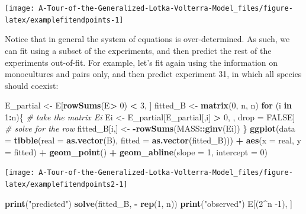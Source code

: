 \documentclass[]{book}
\newenvironment{Shaded}{\begin{snugshade}}{\end{snugshade}}
\newcommand{\CommentTok}[1]{\textcolor[rgb]{0.56,0.35,0.01}{\textit{#1}}}
\newcommand{\ControlFlowTok}[1]{\textcolor[rgb]{0.13,0.29,0.53}{\textbf{#1}}}
\newcommand{\DataTypeTok}[1]{\textcolor[rgb]{0.13,0.29,0.53}{#1}}
\newcommand{\DecValTok}[1]{\textcolor[rgb]{0.00,0.00,0.81}{#1}}
\newcommand{\KeywordTok}[1]{\textcolor[rgb]{0.13,0.29,0.53}{\textbf{#1}}}
\newcommand{\NormalTok}[1]{#1}
\newcommand{\OperatorTok}[1]{\textcolor[rgb]{0.81,0.36,0.00}{\textbf{#1}}}
\newcommand{\OtherTok}[1]{\textcolor[rgb]{0.56,0.35,0.01}{#1}}
\newcommand{\StringTok}[1]{\textcolor[rgb]{0.31,0.60,0.02}{#1}}
\begin{document}
\begin{center}\texttt{[image: A-Tour-of-the-Generalized-Lotka-Volterra-Model\_files/figure-latex/examplefitendpoints-1]} \end{center}

Notice that in general the system of equations is over-determined. As such, we can fit using a subset of the experiments, and then predict the rest of the experiments out-of-fit. For example, let's fit again using the information on monocultures and pairs only, and then predict experiment 31, in which all species should coexist:

\begin{Shaded}
\begin{Highlighting}[]
\NormalTok{E_partial <-}\StringTok{ }\NormalTok{E[}\KeywordTok{rowSums}\NormalTok{(E}\OperatorTok{>}\StringTok{ }\DecValTok{0}\NormalTok{) }\OperatorTok{<}\StringTok{ }\DecValTok{3}\NormalTok{, ]}
\NormalTok{fitted_B <-}\StringTok{ }\KeywordTok{matrix}\NormalTok{(}\DecValTok{0}\NormalTok{, n, n)}
\ControlFlowTok{for}\NormalTok{ (i }\ControlFlowTok{in} \DecValTok{1}\OperatorTok{:}\NormalTok{n)\{}
  \CommentTok{# take the matrix Ei}
\NormalTok{  Ei <-}\StringTok{ }\NormalTok{E_partial[E_partial[,i] }\OperatorTok{>}\StringTok{ }\DecValTok{0}\NormalTok{, , drop =}\StringTok{ }\OtherTok{FALSE}\NormalTok{]}
  \CommentTok{# solve for the row}
\NormalTok{  fitted_B[i,] <-}\StringTok{ }\OperatorTok{-}\KeywordTok{rowSums}\NormalTok{(MASS}\OperatorTok{::}\KeywordTok{ginv}\NormalTok{(Ei))}
\NormalTok{\}}
\KeywordTok{ggplot}\NormalTok{(}\DataTypeTok{data =} \KeywordTok{tibble}\NormalTok{(}\DataTypeTok{real =} \KeywordTok{as.vector}\NormalTok{(B),}
                     \DataTypeTok{fitted =} \KeywordTok{as.vector}\NormalTok{(fitted_B))) }\OperatorTok{+}\StringTok{ }
\StringTok{  }\KeywordTok{aes}\NormalTok{(}\DataTypeTok{x =}\NormalTok{ real, }\DataTypeTok{y =}\NormalTok{ fitted) }\OperatorTok{+}\StringTok{ }\KeywordTok{geom_point}\NormalTok{() }\OperatorTok{+}\StringTok{ }
\StringTok{  }\KeywordTok{geom_abline}\NormalTok{(}\DataTypeTok{slope =} \DecValTok{1}\NormalTok{, }\DataTypeTok{intercept =} \DecValTok{0}\NormalTok{)}
\end{Highlighting}
\end{Shaded}

\begin{center}\texttt{[image: A-Tour-of-the-Generalized-Lotka-Volterra-Model\_files/figure-latex/examplefitendpoints2-1]} \end{center}

\begin{Shaded}
\begin{Highlighting}[]
\KeywordTok{print}\NormalTok{(}\StringTok{"predicted"}\NormalTok{)}
\KeywordTok{solve}\NormalTok{(fitted_B, }\OperatorTok{-}\StringTok{ }\KeywordTok{rep}\NormalTok{(}\DecValTok{1}\NormalTok{, n))}
\KeywordTok{print}\NormalTok{(}\StringTok{"observed"}\NormalTok{)}
\NormalTok{E[(}\DecValTok{2}\OperatorTok{^}\NormalTok{n }\DecValTok{-1}\NormalTok{), ]}
\end{Highlighting}
\end{Shaded}
\end{document}
